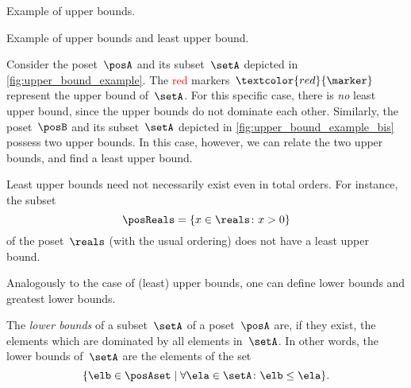 \begin{marginfigure}
    \centering
    \caption{Example of upper bounds. }
    \label{fig:upper_bound_example}
\end{marginfigure}

\begin{marginfigure}
    \centering
    \caption{Example of upper bounds and least upper bound. }
    \label{fig:upper_bound_example_bis}
\end{marginfigure}

\begin{example}
    Consider the poset~$\posA$ and its subset~$\setA$ depicted in \cref{fig:upper_bound_example}.
    The \textcolor{red}{red} markers~$\textcolor{red}{\marker}$ represent the upper bound of~$\setA$.
    For this specific case, there is \emph{no} least upper bound, since the upper bounds do not dominate each other.
    Similarly, the poset~$\posB$ and its subset~$\setA$ depicted in \cref{fig:upper_bound_example_bis} possess two upper bounds.
    In this case, however, we can relate the two upper bounds, and find a least upper bound.
\end{example}

\begin{example}
    Least upper bounds need not necessarily exist even in total orders.
    For instance, the subset
    \begin{equation*}
        \posReals = \{x\in \reals \colon x>0\}
    \end{equation*}
    of the poset~$\reals$ (with the usual ordering) does not have a least upper bound.
\end{example}

Analogously to the case of (least) upper bounds, one can define lower bounds and greatest lower bounds.

\begin{ctdefinition}
    \label{def:greatest-lower-bound}
    The \emph{lower bounds} of a subset~$\setA$ of a poset~$\posA$ are, if they exist, the elements which are dominated by all elements in~$\setA$.
    In other words, the lower  bounds of~$\setA$ are the elements of the set
    \begin{equation*}
        \{ \elb \in \posAset \mid \forall \ela \in \setA  \colon \elb \leq \ela \}.
    \end{equation*}
\end{ctdefinition}

